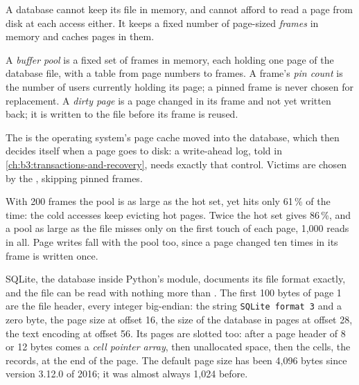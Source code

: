 A database cannot keep its file in memory, and cannot afford to read a page from disk at each access either. It keeps a fixed number of page-sized \emph{frames} in memory and caches pages in them.

\begin{definition}\label{def:b3:database-storage:buffer}
A \emph{buffer pool} is a fixed set of frames in memory, each holding one page of the database file, with a table from page numbers to frames. A frame's \emph{pin count} is the number of users currently holding its page; a pinned frame is never chosen for replacement. A \emph{dirty page} is a page changed in its frame and not yet written back; it is written to the file before its frame is reused.
\end{definition}

The  is the operating system's page cache moved into the database, which then decides itself when a page goes to disk: a write-ahead log, told in \cref{ch:b3:transactions-and-recovery}, needs exactly that control. Victims are chosen by the , skipping pinned frames.

\label{lst:b3:database-storage:bufferpool}

\label{out:b3:database-storage:buffer}

With 200 frames the pool is as large as the hot set, yet hits only 61\,\% of the time: the cold accesses keep evicting hot pages. Twice the hot set gives 86\,\%, and a pool as large as the file misses only on the first touch of each page, 1,000 reads in all. Page writes fall with the pool too, since a page changed ten times in its frame is written once.

SQLite, the database inside Python's  module, documents its file format exactly, and the file can be read with nothing more than . The first 100 bytes of page 1 are the file header, every integer big-endian: the string \texttt{SQLite format 3} and a zero byte, the page size at offset 16, the size of the database in pages at offset 28, the text encoding at offset 56. %
Its pages are slotted too: after a page header of 8 or 12 bytes comes a \emph{cell pointer array}, then unallocated space, then the cells, the records, at the end of the page. %
The default page size has been 4,096 bytes since version 3.12.0 of 2016; it was almost always 1,024 before. %


